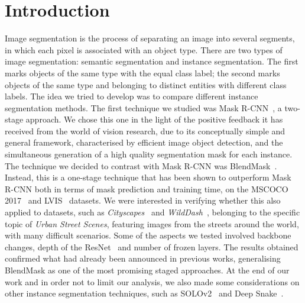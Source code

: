 \documentclass[10pt,twocolumn,letterpaper]{article}
\begin{document}
\section{Introduction}
Image segmentation is the process of separating an image into several segments,  in which each pixel is associated with an object type. There are two types of image segmentation: semantic segmentation and instance segmentation. The first marks objects of the same type with the equal class label; the second marks objects of the same type and belonging to distinct entities with different class labels. The idea we tried to develop was to compare different instance segmentation methods. The first technique we studied was Mask R-CNN~\cite{Authors1_maskrcnn}, a two-stage approach. We chose this one in the light of the positive feedback it has received from the world of vision research, due to its conceptually simple and general framework,  characterised by efficient image object detection, and the simultaneous generation of a high quality segmentation mask for each instance. The technique we decided to contrast with Mask R-CNN was BlendMask~\cite{Authors2_BlendMask}. Instead, this is a one-stage technique that has been shown to outperform Mask R-CNN both in terms of mask prediction and training time, on the MSCOCO 2017~\cite{Authors3_MSCOCO} and LVIS~\cite{Authors4_LVIS} datasets. We were interested in verifying whether this also applied to datasets, such as \textit{Cityscapes}~\cite{cityscapes} and \textit{WildDash}~\cite{wildDash}, belonging to the specific topic of \textit{Urban Street Scenes},  featuring images from the streets around the world, with many difficult scenarios. Some of the aspects we tested involved backbone changes, depth of the ResNet~\cite{Authors5_ResNet} and number of frozen layers.  The results obtained confirmed what had already been announced in previous works, generalising BlendMask as one of the most promising staged approaches. At the end of our work and in order not to limit our analysis, we also made some considerations on other instance segmentation techniques, such as SOLOv2~\cite{Authors6_SOLOv2} and Deep Snake~\cite{Authors7_deepsnake}.
\end{document}
